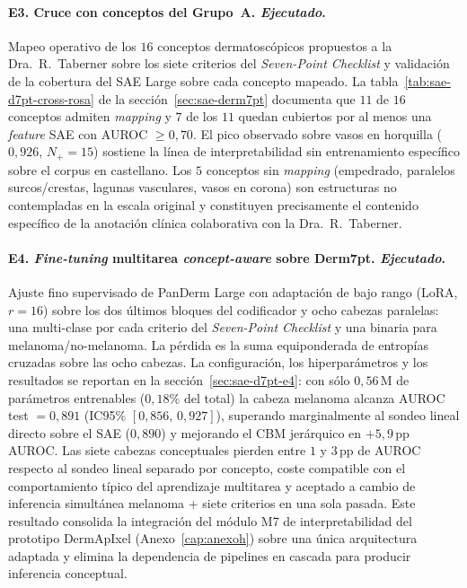 \paragraph{E3. Cruce con conceptos del Grupo~A. \emph{Ejecutado}.}
Mapeo operativo de los $16$ conceptos dermatoscópicos
propuestos a la Dra.~R.~Taberner sobre los siete criterios del
\emph{Seven-Point Checklist} y validación de la cobertura del
SAE Large sobre cada concepto mapeado. La
tabla~\ref{tab:sae-d7pt-cross-rosa} de la
secci\'on~\ref{sec:sae-derm7pt} documenta que $11$ de
$16$ conceptos admiten \emph{mapping} y $7$ de los $11$
quedan cubiertos por al menos una \emph{feature} SAE con AUROC
$\geq 0{,}70$. El pico observado sobre vasos en horquilla
($0{,}926$, $N_{+} = 15$) sostiene la línea de
interpretabilidad sin entrenamiento específico sobre el corpus en
castellano. Los $5$ conceptos sin \emph{mapping} (empedrado,
paralelos surcos/crestas, lagunas vasculares, vasos en corona) son
estructuras no contempladas en la escala original y constituyen
precisamente el contenido específico de la anotación clínica
colaborativa con la Dra.~R.~Taberner.

\paragraph{E4. \emph{Fine-tuning} multitarea \emph{concept-aware}
sobre Derm7pt. \emph{Ejecutado}.}
Ajuste fino supervisado de PanDerm Large con adaptación de bajo
rango (LoRA, $r = 16$) sobre los dos últimos bloques del
codificador y ocho cabezas paralelas: una multi-clase por cada
criterio del \emph{Seven-Point Checklist} y una binaria para
melanoma/no-melanoma. La pérdida es la suma equiponderada de
entropías cruzadas sobre las ocho cabezas. La configuración,
los hiperparámetros y los resultados se reportan en la
secci\'on~\ref{sec:sae-d7pt-e4}: con sólo $0{,}56$\,M de
parámetros entrenables ($0{,}18\%$ del total) la cabeza
melanoma alcanza AUROC test $= 0{,}891$ (IC95\%
$[0{,}856,\,0{,}927]$), superando marginalmente al sondeo lineal
directo sobre el SAE ($0{,}890$) y mejorando el CBM jerárquico
en $+5{,}9$\,pp AUROC. Las siete cabezas conceptuales pierden
entre $1$ y $3$\,pp de AUROC respecto al sondeo lineal separado
por concepto, coste compatible con el comportamiento típico del
aprendizaje multitarea y aceptado a cambio de inferencia
simultánea melanoma + siete criterios en una sola pasada. Este
resultado consolida la integración del módulo M7 de
interpretabilidad del prototipo DermApIxel
(Anexo~\ref{cap:anexoh}) sobre una única arquitectura adaptada y
elimina la dependencia de pipelines en cascada para producir
inferencia conceptual.

